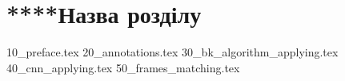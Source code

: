 \chapter{****Назва розділу}
{10_preface.tex}
{20_annotations.tex}
{30_bk_algorithm_applying.tex}
{40_cnn_applying.tex}
{50_frames_matching.tex}